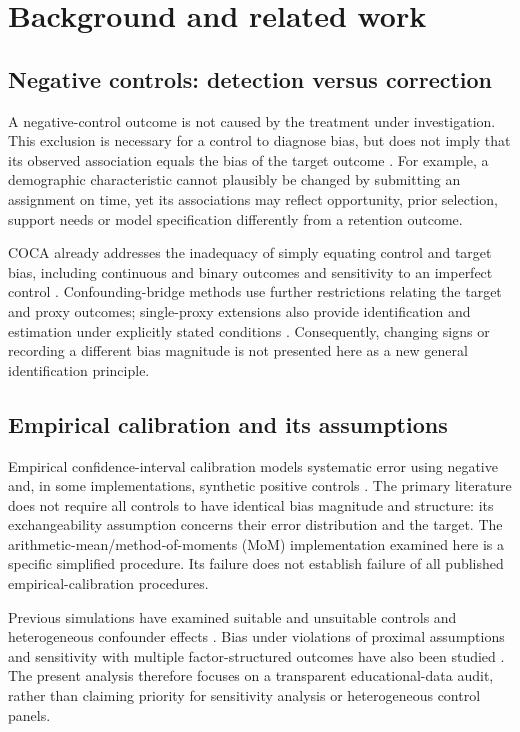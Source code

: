 \section{Background and related work}

\subsection{Negative controls: detection versus correction}

A negative-control outcome is not caused by the treatment under investigation. This exclusion is necessary for a control to diagnose bias, but does not imply that its observed association equals the bias of the target outcome \cite{lipsitch2010,coca2014}. For example, a demographic characteristic cannot plausibly be changed by submitting an assignment on time, yet its associations may reflect opportunity, prior selection, support needs or model specification differently from a retention outcome.

COCA already addresses the inadequacy of simply equating control and target bias, including continuous and binary outcomes and sensitivity to an imperfect control \cite{coca2014}. Confounding-bridge methods use further restrictions relating the target and proxy outcomes; single-proxy extensions also provide identification and estimation under explicitly stated conditions \cite{miao2024,park2024}. Consequently, changing signs or recording a different bias magnitude is not presented here as a new general identification principle.

\subsection{Empirical calibration and its assumptions}

Empirical confidence-interval calibration models systematic error using negative and, in some implementations, synthetic positive controls \cite{schuemie2018}. The primary literature does not require all controls to have identical bias magnitude and structure: its exchangeability assumption concerns their error distribution and the target. The arithmetic-mean/method-of-moments (MoM) implementation examined here is a specific simplified procedure. Its failure does not establish failure of all published empirical-calibration procedures.

Previous simulations have examined suitable and unsuitable controls and heterogeneous confounder effects \cite{hwang2022}. Bias under violations of proximal assumptions and sensitivity with multiple factor-structured outcomes have also been studied \cite{cobzaru2024,zheng2024}. The present analysis therefore focuses on a transparent educational-data audit, rather than claiming priority for sensitivity analysis or heterogeneous control panels.

